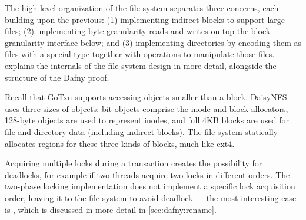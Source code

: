 The high-level organization of the file system separates three concerns, each
building upon the previous: (1) implementing indirect blocks to support large
files; (2) implementing byte-granularity
reads and writes on top the block-granularity interface below; and (3) implementing
directories by encoding them as files with a special type together with
operations to manipulate those files.  explains the
internals of the file-system design in more detail, alongside the structure of
the Dafny proof.


Recall that GoTxn supports accessing objects smaller than a block. DaisyNFS uses
three sizes of objects: bit objects comprise the inode and block allocators,
128-byte objects are used to represent inodes, and full 4KB blocks are used for
file and directory data (including indirect blocks). The file system statically
allocates regions for these three kinds of blocks, much like ext4.

Acquiring multiple locks during a transaction creates the possibility
for deadlocks, for example if two threads acquire two locks in different orders.
The two-phase locking implementation does not implement a
specific lock acquisition order, leaving it to the file system to
avoid deadlock --- the most interesting case is , which is discussed
in more detail in \cref{sec:dafny:rename}.
